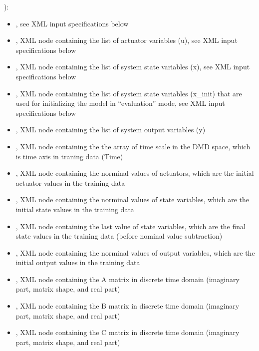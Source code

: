   ):         \begin{itemize}           \item {}, see XML input
  specifications below           \item {}, XML node containing the list of actuator
  variables (u),                 see XML input specifications below           \item
  , XML node containing the list of system state variables (x),
  see XML input specifications below           \item {}, XML node
  containing the list of system state variables                 (x\_init) that are used for
  initializing the model in ``evaluation'' mode,                 see XML input specifications below
  \item {}, XML node containing the list of system output variables (y)
  \item {}, XML node containing the the array of time scale in the DMD space,
  which is time axis in traning data (Time)           \item {}, XML node containing the
  norminal values of actuators,                 which are the initial actuator values in the
  training data           \item {}, XML node containing the norminal values of state
  variables,                 which are the initial state values in the training data           \item
  , XML node containing the last value of state variables,                 which are
  the final state values in the training data (before nominal value subtraction)           \item
  , XML node containing the norminal values of output variables,
  which are the initial output values in the training data           \item {},  XML
  node containing the A matrix in discrete time domain                 (imaginary part, matrix
  shape, and real part)           \item {}, XML node containing the B matrix in
  discrete time domain                 (imaginary part, matrix shape, and real part)           \item
  , XML node containing the C matrix in discrete time domain
  (imaginary part, matrix shape, and real part)         \end{itemize}

